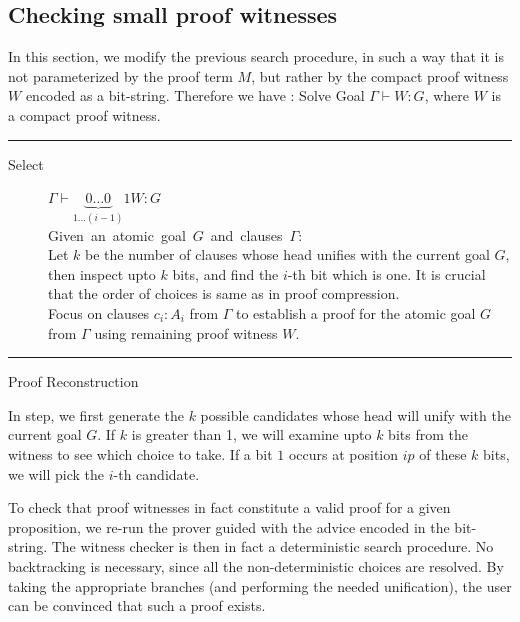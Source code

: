 \documentclass{acmconf}
\newcommand{\figfoot}{\vspace{1ex}\hrule}
\newcommand{\fighead}{\hrule\vspace{1.5ex}}
\newcommand{\vd}{\vdash}
\begin{document}
\subsection{Checking small proof witnesses}
In this section, we modify the previous search procedure, in such a
way that it is not parameterized by the proof term $M$, but rather by
the compact proof witness $W$ encoded as a bit-string. Therefore we
have : Solve Goal $\Gamma \vd W : G$, where $W$ is a compact proof witness.  

\begin{table}[h]
\fighead
\begin{center}
\begin{small}
\begin{description}
\item[Select] $\Gamma \vd \underset{1 \ldots
    (i-1)}{\underbrace{0\ldots 0}}1
W : G $ \\
    \mbox{Given an atomic goal $G$ and clauses $\Gamma$:}\hfill\\
    Let $k$ be the number of clauses whose head unifies with the
    current goal $G$, then inspect upto $k$ bits, and
    find the $i$-th bit which is one. It is crucial that the order 
    of choices is same as in proof compression.\\  
    Focus on clauses $c_i : A_i$ from $\Gamma$ to establish a proof
    for the atomic goal $G$ from $\Gamma$ using remaining proof witness $W$.
\end{description}
\end{small}    
\end{center}
\figfoot
\caption{\label{fig:pwrecon} Proof Reconstruction}
\end{table}

In {} step, we first generate the $k$ possible candidates
whose head will unify with the current goal $G$. If $k$ is greater
than 1, we will examine upto $k$ bits from the witness to see which
choice to take. If a bit $1$ occurs at position $ip$ of these $k$
bits, we will pick the $i$-th candidate.

To check that proof witnesses in fact constitute a valid proof for a
given proposition, we re-run the prover guided with the advice encoded
in the bit-string. The witness checker is then in fact a deterministic
search procedure. No backtracking is necessary, since all the
non-deterministic choices are resolved.  By taking the appropriate
branches (and performing the needed unification), the user can be
convinced that such a proof exists. 
\end{document}
